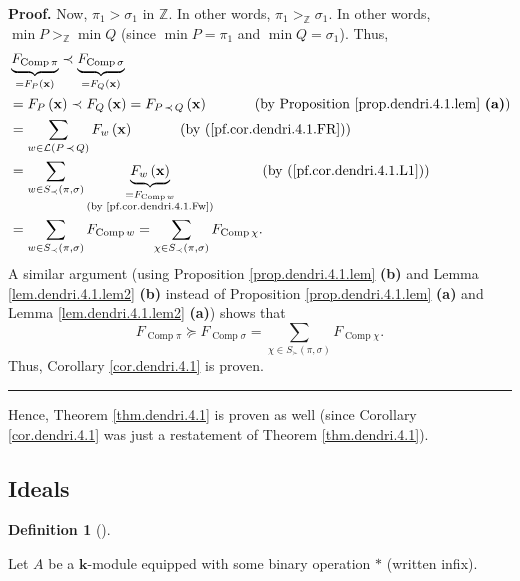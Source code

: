 \documentclass[numbers=enddot,12pt,final,onecolumn,notitlepage]{scrartcl}%
\theoremstyle{definition}
\newtheorem{defi}[theo]{Definition}
\newenvironment{definition}[1][]
{\begin{defi}[#1]\begin{leftbar}}
{\end{leftbar}\end{defi}}
\newenvironment{proof}[1][Proof]{\noindent\textbf{#1.} }{\ \rule{0.5em}{0.5em}}
\newenvironment{verlong}{}{}
\let\sumnonlimits\sum
\renewcommand{\sum}{\sumnonlimits\limits}
\begin{document}
\begin{verlong}
\begin{proof}
Now, $\pi_{1}>\sigma_{1}$ in $\mathbb{Z}$. In other words, $\pi_{1}%
>_{\mathbb{Z}}\sigma_{1}$. In other words, $\min P>_{\mathbb{Z}}\min Q$ (since
$\min P=\pi_{1}$ and $\min Q=\sigma_{1}$). Thus,
\begin{align*}
& \underbrace{F_{\operatorname*{Comp}\pi}}_{=F_{P}\left(  \mathbf{x}\right)
}\left.  \prec\right.  \underbrace{F_{\operatorname*{Comp}\sigma}}%
_{=F_{Q}\left(  \mathbf{x}\right)  }\\
& =F_{P}\left(  \mathbf{x}\right)  \left.  \prec\right.  F_{Q}\left(
\mathbf{x}\right)  =F_{P\left.  \prec\right.  Q}\left(  \mathbf{x}\right)
\ \ \ \ \ \ \ \ \ \ \left(  \text{by Proposition \ref{prop.dendri.4.1.lem}
\textbf{(a)}}\right)  \\
& =\sum_{w\in\mathcal{L}\left(  P\left.  \prec\right.  Q\right)  }F_{w}\left(
\mathbf{x}\right)  \ \ \ \ \ \ \ \ \ \ \left(  \text{by
(\ref{pf.cor.dendri.4.1.FR})}\right)  \\
& =\sum_{w\in S_{\prec}\left(  \pi,\sigma\right)  }\underbrace{F_{w}\left(
\mathbf{x}\right)  }_{\substack{=F_{\operatorname*{Comp}w}\\\text{(by
\eqref{pf.cor.dendri.4.1.Fw})}}}\ \ \ \ \ \ \ \ \ \ \left(  \text{by
(\ref{pf.cor.dendri.4.1.L1})}\right)  \\
& =\sum_{w\in S_{\prec}\left(  \pi,\sigma\right)  }F_{\operatorname*{Comp}%
w}=\sum_{\chi\in S_{\prec}\left(  \pi,\sigma\right)  }F_{\operatorname*{Comp}%
\chi}.
\end{align*}
A similar argument (using Proposition \ref{prop.dendri.4.1.lem} \textbf{(b)}
and Lemma \ref{lem.dendri.4.1.lem2} \textbf{(b)} instead of Proposition
\ref{prop.dendri.4.1.lem} \textbf{(a)} and Lemma \ref{lem.dendri.4.1.lem2}
\textbf{(a)}) shows that%
\[
F_{\operatorname*{Comp}\pi}\left.  \succeq\right.  F_{\operatorname*{Comp}%
\sigma}=\sum_{\chi\in S_{\succ}\left(  \pi,\sigma\right)  }%
F_{\operatorname*{Comp}\chi}.
\]
Thus, Corollary \ref{cor.dendri.4.1} is proven.
\end{proof}

Hence, Theorem \ref{thm.dendri.4.1} is proven as well (since Corollary
\ref{cor.dendri.4.1} was just a restatement of Theorem \ref{thm.dendri.4.1}).

\subsection{Ideals}

\begin{definition}
Let $A$ be a $\mathbf{k}$-module equipped with some binary operation $\ast$
(written infix).


\end{definition}
\end{verlong}
\end{document}
